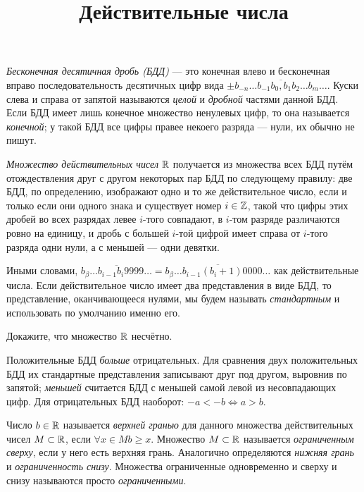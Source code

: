 \documentclass[a4paper, 12pt, num=27]{listok}
\begin{document}
\title{Действительные числа}
\maketitle{}
\begin{definition}
	\textit{Бесконечная десятичная дробь (БДД)} --- это конечная влево и бесконечная вправо последовательность десятичных цифр вида
	$\pm\overline{b_{-n}\ldots b_{-1}b_0{,}b_1b_2\ldots b_m\ldots}$.
	Куски слева и справа от запятой называются \textit{целой} и \textit{дробной} частями данной БДД.
	Если БДД имеет лишь конечное множество ненулевых цифр, то она называется \textit{конечной};
	у такой БДД все цифры правее некоего разряда --- нули, их обычно не пишут.
\end{definition}
\begin{definition}
	\textit{Множество действительных чисел} $\mathbb{R}$ получается из множества всех БДД путём отождествления друг с другом некоторых пар
	БДД по следующему правилу: две БДД, по определению, изображают одно и то же действительное число, если и только если они одного знака
	и существует номер $i \in \mathbb{Z}$, такой что цифры этих дробей во всех разрядах левее $i$-того совпадают, в $i$-том разряде различаются ровно на единицу,
	и дробь с большей $i$-той цифрой имеет справа от $i$-того разряда одни нули, а с меньшей — одни девятки.

	Иными словами, $\overline{b_\beta \ldots b_{i - 1}b_{i}9999\ldots} = \overline{b_\beta \ldots b_{i - 1}(b_i + 1)0000\ldots}$ как действительные числа.
	Если действительное число имеет два представления в виде БДД, то представление, оканчивающееся нулями,
	мы будем называть \textit{стандартным} и использовать по умолчанию именно его.
\end{definition}
\begin{problem}
	Докажите, что множество $\mathbb{R}$ несчётно.
\end{problem}
\begin{definition}
	Положительные БДД \textit{больше} отрицательных.
	Для сравнения двух положительных БДД их стандартные представления записывают друг под другом,
	выровнив по запятой; \textit{меньшей} считается БДД с меньшей самой левой из несовпадающих цифр.
	Для отрицательных БДД наоборот: $-a < -b \Leftrightarrow a > b$.
\end{definition}
\begin{definition}
	Число $b \in \mathbb{R}$ называется \textit{верхней гранью} для данного множества действительных чисел $M \subset \mathbb{R}$,
	если $\forall{x \in M} b \ge x$. Множество $M \subset \mathbb{R}$ называется \textit{ограниченным сверху}, если у него есть верхняя грань.
	Аналогично определяются \textit{нижняя грань} и \textit{ограниченность снизу}.
	Множества ограниченные одновременно и сверху и снизу называются просто \textit{ограниченными}.
\end{definition}
\end{document}
